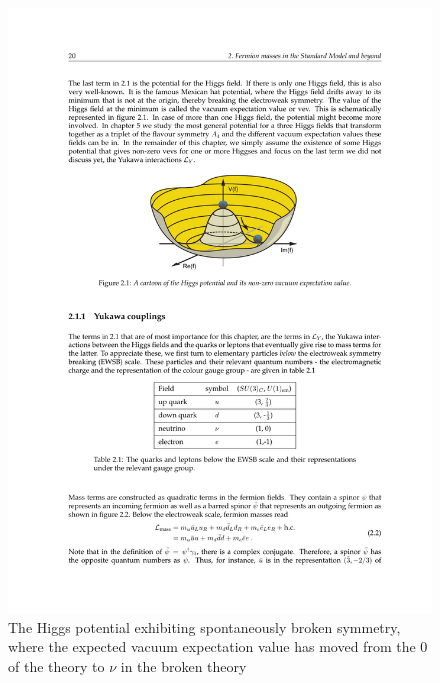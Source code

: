 \begin{figure}
\begin{center}
\includegraphics[width=.55\textwidth]{pics/higgs_potential}
\end{center}
\caption{The Higgs potential exhibiting spontaneously broken symmetry, where the expected vacuum expectation
value has moved from the $0$ of the theory to $\nu$ in the broken theory}
\end{figure}

